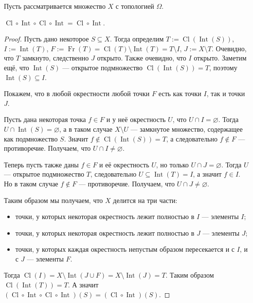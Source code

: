 \documentclass[12pt,a4paper]{article}
\DeclareMathOperator{\Cl}{Cl}
\DeclareMathOperator{\Int}{Int}
\DeclareMathOperator{\Fr}{Fr}
\begin{document}
    \begin{problem}{18}
        Пусть рассматривается множество $X$ с топологией $\Omega$.

        \begin{lemma}
            $\Cl \circ \Int \circ \Cl \circ \Int = \Cl \circ \Int$.
        \end{lemma}

        \begin{proof}
            Пусть дано некоторое $S \subseteq X$. Тогда определим $T := \Cl(\Int(S))$, $I := \Int(T)$, $F := \Fr(T) = \Cl(T) \setminus \Int(T) = T \setminus I$, $J := X \setminus T$. Очевидно, что $T$ замкнуто, следственно $J$ открыто. Также очевидно, что $I$ открыто. Заметим ещё, что $\Int(S)$ --- открытое подмножество $\Cl(\Int(S)) = T$, поэтому $\Int(S) \subseteq I$.

            Покажем, что в любой окрестности любой точки $F$ есть как точки $I$, так и точки $J$.

            Пусть дана некоторая точка $f \in F$ и у неё окрестность $U$, что $U \cap I = \varnothing$. Тогда $U \cap \Int(S) = \varnothing$, а в таком случае $X \setminus U$ --- замкнутое множество, содержащее как подмножество $S$. Значит $f \notin \Cl(\Int(S)) = T$, а следовательно $f \notin F$ --- противоречие. Получаем, что $U \cap I \neq \varnothing$.

            Теперь пусть также даны $f \in F$ и её окрестность $U$, но только $U \cap J = \varnothing$. Тогда $U$ --- открытое подмножество $T$, следовательно $U \subseteq \Int(T) = I$, а значит $f \in I$. Но в таком случае $f \notin F$ --- противоречие. Получаем, что $U \cap J \neq \varnothing$.

            Таким образом мы получаем, что $X$ делится на три части:
            \begin{itemize}
                \item точки, у которых некоторая окрестность лежит полностью в $I$ --- элементы $I$;
                \item точки, у которых некоторая окрестность лежит полностью в $J$ --- элементы $J$;
                \item точки, у которых каждая окрестность непустым образом пересекается и с $I$, и с $J$ --- элементы $F$.
            \end{itemize}

            Тогда $\Cl(I) = X \setminus \Int(J \cup F) = X \setminus \Int(J) = T$. Таким образом $\Cl(\Int(T)) = T$. А значит $(\Cl\circ\Int\circ\Cl\circ\Int)(S) = (\Cl \circ \Int)(S)$.
        \end{proof}


\end{problem}
\end{document}
